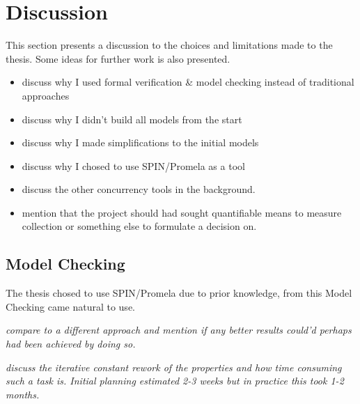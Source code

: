 \chapter{Discussion} 

This section presents a discussion to the choices and limitations made to the thesis. Some ideas for further work is also presented.

\begin{itemize}
\item discuss why I used formal verification \& model checking instead of traditional approaches
\item discuss why I didn't build all models from the start
\item discuss why I made simplifications to the initial models
\item discuss why I chosed to use SPIN/Promela as a tool
\item discuss the other concurrency tools in the background.
\item mention that the project should had sought quantifiable means to measure collection or something else to formulate a decision on.
\end{itemize}



\section{Model Checking}

The thesis chosed to use SPIN/Promela due to prior knowledge, from this Model Checking came natural to use. 

\textit{compare to a different approach and mention if any better results could'd perhaps had been achieved by doing so.}

\textit{discuss the iterative constant rework of the properties and how time consuming such a task is. Initial planning estimated 2-3 weeks but in practice this took 1-2 months.}

